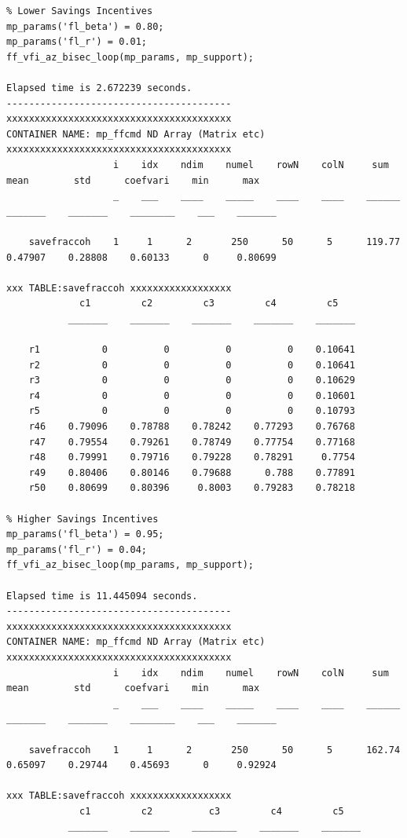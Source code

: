\documentclass[
]{book}
\begin{document}
\begin{verbatim}
% Lower Savings Incentives
mp_params('fl_beta') = 0.80;
mp_params('fl_r') = 0.01;
ff_vfi_az_bisec_loop(mp_params, mp_support);

Elapsed time is 2.672239 seconds.
----------------------------------------
xxxxxxxxxxxxxxxxxxxxxxxxxxxxxxxxxxxxxxxx
CONTAINER NAME: mp_ffcmd ND Array (Matrix etc)
xxxxxxxxxxxxxxxxxxxxxxxxxxxxxxxxxxxxxxxx
                   i    idx    ndim    numel    rowN    colN     sum       mean        std      coefvari    min      max  
                   _    ___    ____    _____    ____    ____    ______    _______    _______    ________    ___    _______

    savefraccoh    1     1      2       250      50      5      119.77    0.47907    0.28808    0.60133      0     0.80699

xxx TABLE:savefraccoh xxxxxxxxxxxxxxxxxx
             c1         c2         c3         c4         c5   
           _______    _______    _______    _______    _______

    r1           0          0          0          0    0.10641
    r2           0          0          0          0    0.10641
    r3           0          0          0          0    0.10629
    r4           0          0          0          0    0.10601
    r5           0          0          0          0    0.10793
    r46    0.79096    0.78788    0.78242    0.77293    0.76768
    r47    0.79554    0.79261    0.78749    0.77754    0.77168
    r48    0.79991    0.79716    0.79228    0.78291     0.7754
    r49    0.80406    0.80146    0.79688      0.788    0.77891
    r50    0.80699    0.80396     0.8003    0.79283    0.78218

% Higher Savings Incentives
mp_params('fl_beta') = 0.95;
mp_params('fl_r') = 0.04;
ff_vfi_az_bisec_loop(mp_params, mp_support);

Elapsed time is 11.445094 seconds.
----------------------------------------
xxxxxxxxxxxxxxxxxxxxxxxxxxxxxxxxxxxxxxxx
CONTAINER NAME: mp_ffcmd ND Array (Matrix etc)
xxxxxxxxxxxxxxxxxxxxxxxxxxxxxxxxxxxxxxxx
                   i    idx    ndim    numel    rowN    colN     sum       mean        std      coefvari    min      max  
                   _    ___    ____    _____    ____    ____    ______    _______    _______    ________    ___    _______

    savefraccoh    1     1      2       250      50      5      162.74    0.65097    0.29744    0.45693      0     0.92924

xxx TABLE:savefraccoh xxxxxxxxxxxxxxxxxx
             c1         c2          c3         c4         c5   
           _______    _______    ________    _______    _______


\end{verbatim}
\end{document}
